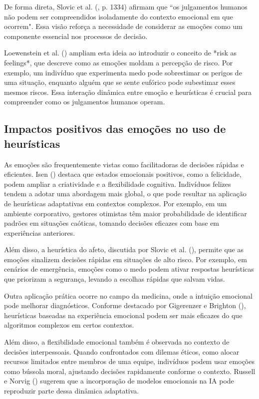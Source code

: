 \documentclass[a4paper,12pt]{report}
\begin{document}
	De forma direta, Slovic et al. (\citeyear{slovic2007}, p. 1334) afirmam que “os julgamentos humanos não podem ser compreendidos isoladamente do contexto emocional em que ocorrem". Essa visão reforça a necessidade de considerar as emoções como um componente essencial nos processos de decisão.
	
	Loewenstein et al. (\citeyear{loewenstein2001}) ampliam esta ideia ao introduzir o conceito de *risk as feelings*, que descreve como as emoções moldam a percepção de risco. Por exemplo, um indivíduo que experimenta medo pode sobrestimar os perigos de uma situação, enquanto alguém que se sente eufórico pode subestimar esses mesmos riscos. Essa interação dinâmica entre emoção e heurísticas é crucial para compreender como os julgamentos humanos operam.
	
	\subsection{Impactos positivos das emoções no uso de heurísticas}
	
	As emoções são frequentemente vistas como facilitadoras de decisões rápidas e eficientes. Isen (\citeyear{isen2001}) destaca que estados emocionais positivos, como a felicidade, podem ampliar a criatividade e a flexibilidade cognitiva. Indivíduos felizes tendem a adotar uma abordagem mais global, o que pode resultar na aplicação de heurísticas adaptativas em contextos complexos. Por exemplo, em um ambiente corporativo, gestores otimistas têm maior probabilidade de identificar padrões em situações caóticas, tomando decisões eficazes com base em experiências anteriores.
	
	Além disso, a heurística do afeto, discutida por Slovic et al. (\citeyear{slovic2007}), permite que as emoções sinalizem decisões rápidas em situações de alto risco. Por exemplo, em cenários de emergência, emoções como o medo podem ativar respostas heurísticas que priorizam a segurança, levando a escolhas rápidas que salvam vidas.
	
	Outra aplicação prática ocorre no campo da medicina, onde a intuição emocional pode melhorar diagnósticos. Conforme destacado por Gigerenzer e Brighton (\citeyear{gigerenzer2009}), heurísticas baseadas na experiência emocional podem ser mais eficazes do que algoritmos complexos em certos contextos.
	
	Além disso, a flexibilidade emocional também é observada no contexto de decisões interpessoais. Quando confrontados com dilemas éticos, como alocar recursos limitados entre membros de uma equipe, indivíduos podem usar emoções como bússola moral, ajustando decisões rapidamente conforme o contexto. Russell e Norvig (\citeyear{russell2020}) sugerem que a incorporação de modelos emocionais na IA pode reproduzir parte dessa dinâmica adaptativa.
	
\end{document}
